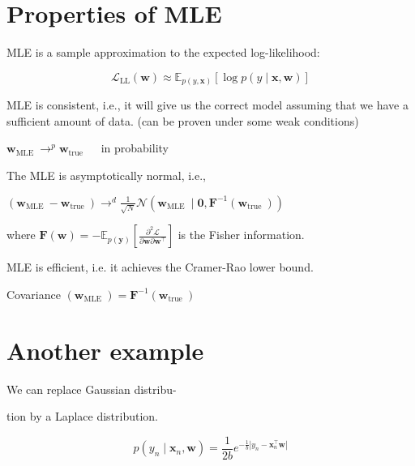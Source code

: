 \section*{Properties of MLE}
MLE is a sample approximation to the expected log-likelihood:

$$
\mathcal{L}_{\mathrm{LL}}(\mathbf{w}) \approx \mathbb{E}_{p(y, \mathbf{x})}[\log p(y \mid \mathbf{x}, \mathbf{w})]
$$

MLE is consistent, i.e., it will give us the correct model assuming that we have a sufficient amount of data. (can be proven under some weak conditions)

$\mathbf{w}_{\text {MLE }} \longrightarrow^{p} \mathbf{w}_{\text {true }} \quad$ in probability

The MLE is asymptotically normal, i.e.,

$\left(\mathbf{w}_{\text {MLE }}-\mathbf{w}_{\text {true }}\right) \longrightarrow^{d} \frac{1}{\sqrt{N}} \mathcal{N}\left(\mathbf{w}_{\text {MLE }} \mid \mathbf{0}, \mathbf{F}^{-1}\left(\mathbf{w}_{\text {true }}\right)\right)$

where $\mathbf{F}(\mathbf{w})=-\mathbb{E}_{p(\mathbf{y})}\left[\frac{\partial^{2} \mathcal{L}}{\partial \mathbf{w} \partial \mathbf{w}^{\top}}\right]$ is the Fisher information.

MLE is efficient, i.e. it achieves the Cramer-Rao lower bound.

Covariance $\left(\mathbf{w}_{\text {MLE }}\right)=\mathbf{F}^{-1}\left(\mathbf{w}_{\text {true }}\right)$

\section*{Another example}
We can replace Gaussian distribu-

tion by a Laplace distribution.

$$
p\left(y_{n} \mid \mathbf{x}_{n}, \mathbf{w}\right)=\frac{1}{2 b} e^{-\frac{1}{b}\left|y_{n}-\mathbf{x}_{n}^{\top} \mathbf{w}\right|}
$$
